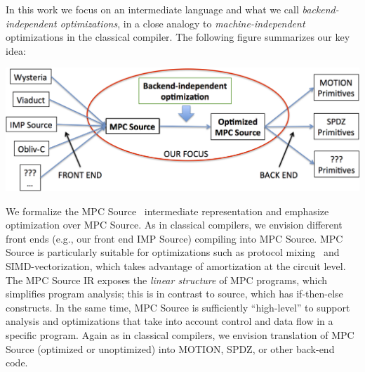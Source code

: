 
In this work we focus on an intermediate language and what we call \emph{backend-independent optimizations}, in a close analogy to \emph{machine-independent} optimizations
in the classical compiler. The following figure summarizes our key idea:

{\begin{center}
\includegraphics[width=0.8\linewidth]{figs_paper_SIMD/focus.png}
\end{center}
}

We formalize the MPC Source~\cite{Ishaq:2019} intermediate representation and emphasize optimization over MPC Source. As in classical compilers, we envision different front ends (e.g., our front end IMP Source) compiling into MPC Source. MPC Source is particularly suitable for optimizations such as protocol mixing~\cite{Buscher:2018b,Ishaq:2019, Fang:2022} and SIMD-vectorization,
which takes advantage of amortization at the circuit level. The MPC Source IR exposes the \emph{linear structure} of MPC programs, which simplifies program analysis; this is
in contrast to source, which has if-then-else constructs. In the same time, MPC Source is sufficiently ``high-level''  to support analysis and optimizations that take into account
control and data flow in a specific program. %
Again as in classical compilers, we envision translation of MPC Source (optimized or unoptimized) into MOTION, SPDZ, or other back-end code.




